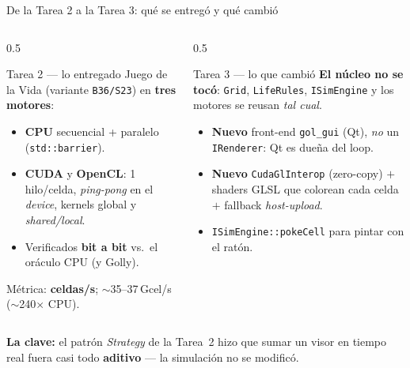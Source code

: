 \documentclass[aspectratio=169]{beamer}
\begin{document}
\begin{frame}{De la Tarea 2 a la Tarea 3: qué se entregó y qué cambió}
    \footnotesize
    \begin{columns}[T]
        \begin{column}{0.5\textwidth}
            \begin{block}{Tarea 2 --- lo entregado}
                \scriptsize
                Juego de la Vida (variante \texttt{B36/S23}) en \textbf{tres motores}:
                \begin{itemize}\scriptsize
                    \item \textbf{CPU} secuencial + paralelo (\texttt{std::barrier}).
                    \item \textbf{CUDA} y \textbf{OpenCL}: 1 hilo/celda, \emph{ping-pong}
                          en el \emph{device}, kernels global y \emph{shared/local}.
                    \item Verificados \textbf{bit a bit} vs.\ el oráculo CPU (y Golly).
                \end{itemize}
                Métrica: \textbf{celdas/s}; \alert{$\sim$35--37\,Gcel/s} ($\sim$240$\times$ CPU).
            \end{block}
        \end{column}
        \begin{column}{0.5\textwidth}
            \begin{block}{Tarea 3 --- lo que cambió}
                \scriptsize
                \textbf{El núcleo no se tocó}: \texttt{Grid}, \texttt{LifeRules},
                \texttt{ISimEngine} y los motores se reusan \emph{tal cual}.
                \begin{itemize}\scriptsize
                    \item \textbf{Nuevo} front-end \texttt{gol\_gui} (Qt), \emph{no} un
                          \texttt{IRenderer}: Qt es dueña del loop.
                    \item \textbf{Nuevo} \texttt{CudaGlInterop} (zero-copy) $+$ shaders
                          GLSL que colorean cada celda $+$ fallback \emph{host-upload}.
                    \item \texttt{ISimEngine::pokeCell} para pintar con el ratón.
                \end{itemize}
            \end{block}
        \end{column}
    \end{columns}
    \begin{highlightbox}
        \footnotesize
        \textbf{La clave:} el patrón \emph{Strategy} de la Tarea~2 hizo que sumar un
        visor en tiempo real fuera casi todo \textbf{aditivo} --- la simulación no se
        modificó.
    \end{highlightbox}
\end{frame}
\end{document}
